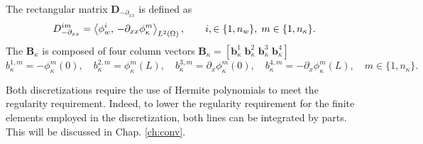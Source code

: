 The rectangular matrix $\mathbf{D}_{-\partial_{xx}}$ is defined as 
\begin{equation}
D_{-\partial_{xx}}^{im} = \inner[L^2(\Omega)]{\phi_w^i}{-\partial_{xx}\phi_\kappa^m}, \qquad i, \in \{1, n_w\}, \; m \in \{1, n_\kappa\}.
\end{equation}
The $\mathbf{B}_\kappa$ is composed of four column vectors $\mathbf{B}_\kappa = [\mathbf{b}_\kappa^{1} \; \mathbf{b}_\kappa^{2} \; \mathbf{b}_\kappa^3 \; \mathbf{b}_\kappa^4]$
\begin{equation}
{b}_\kappa^{1,m} = -\phi_\kappa^m(0), \quad {b}_\kappa^{2,m} = \phi_\kappa^m(L), \quad {b}_\kappa^{3,m} = \partial_x \phi_\kappa^m(0), \quad {b}_\kappa^{4,m} = -\partial_x \phi_\kappa^m(L) , \quad m \in \{1, n_\kappa\}.
\end{equation}

Both discretizations require the use of Hermite polynomials to meet the regularity requirement. Indeed, to lower the regularity requirement for the finite elements employed in the discretization, both lines can be integrated by parts. This will be discussed in Chap. \ref{ch:conv}.

